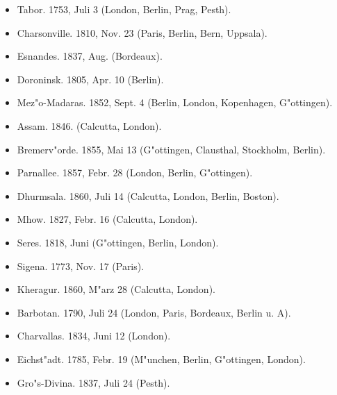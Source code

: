 \documentclass[a4paper, 11pt, oneside]{article}
\begin{document}
\begin{itemize}
\begin{itemize}
\begin{itemize}
            \item Tabor. 1753, Juli 3 (London, Berlin, Prag, Pesth).
        
            \item Charsonville. 1810, Nov. 23 (Paris, Berlin, Bern, Uppsala).
        
            \item Esnandes. 1837, Aug. (Bordeaux).
        
            \item Doroninsk. 1805, Apr. 10 (Berlin).
        
            \item Mez"o-Madaras. 1852, Sept. 4 (Berlin, London, Kopenhagen, G"ottingen).
        
            \item Assam. 1846. (Calcutta, London).
        
            \item Bremerv"orde. 1855, Mai 13 (G"ottingen, Clausthal, Stockholm, Berlin).
        
            \item Parnallee. 1857, Febr. 28 (London, Berlin, G"ottingen).
        
            \item Dhurmsala. 1860, Juli 14 (Calcutta, London, Berlin, Boston).
        
            \item Mhow. 1827, Febr. 16 (Calcutta, London).
        
            \item Seres. 1818, Juni (G"ottingen, Berlin, London).
        
            \item Sigena. 1773, Nov. 17 (Paris).
        
            \item Kheragur. 1860, M"arz 28 (Calcutta, London).
        
            \item Barbotan. 1790, Juli 24 (London, Paris, Bordeaux, Berlin u. A).
        
            \item Charvallas. 1834, Juni 12 (London).
        
            \item Eichst"adt. 1785, Febr. 19 (M"unchen, Berlin, G"ottingen, London).
        
            \item Gro"s-Divina. 1837, Juli 24 (Pesth).
        

\end{itemize}
\end{itemize}
\end{itemize}
\end{document}
